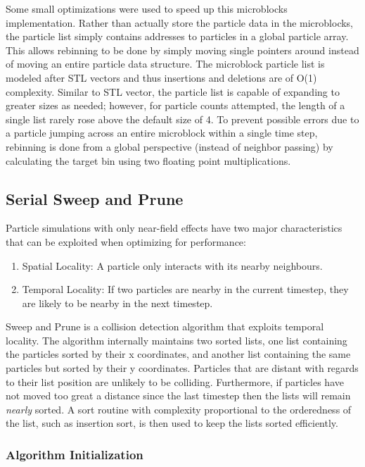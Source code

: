 \documentclass[11pt]{article} %
\begin{document}
Some small optimizations were used to speed up this microblocks implementation. Rather than actually store the particle data in the microblocks, the particle list simply contains addresses to particles in a global particle array. This allows rebinning to be done by simply moving single pointers around instead of moving an entire particle data structure. The microblock particle list is modeled after STL vectors and thus insertions and deletions are of O(1) complexity. Similar to STL vector, the particle list is capable of expanding to greater sizes as needed; however, for particle counts attempted, the length of a single list rarely rose above the default size of 4. To prevent possible errors due to a particle jumping across an entire microblock within a single time step, rebinning is done from a global perspective (instead of neighbor passing) by calculating the target bin using two floating point multiplications.

\subsection{Serial Sweep and Prune}

Particle simulations with only near-field effects have two major characteristics
that can be exploited when optimizing for performance:
\begin{enumerate}
\item Spatial Locality: A particle only interacts with its nearby neighbours.
\item Temporal Locality: If two particles are nearby in the current timestep,
they are likely to be nearby in the next timestep.
\end{enumerate}
Sweep and Prune is a collision detection algorithm that exploits temporal
locality. The algorithm internally maintains two sorted lists, one
list containing the particles sorted by their x coordinates, and another
list containing the same particles but sorted by their y coordinates.
Particles that are distant with regards to their list position are
unlikely to be colliding. Furthermore, if particles have not moved
too great a distance since the last timestep then the lists will remain
\emph{nearly} sorted. A sort routine with complexity proportional
to the orderedness of the list, such as insertion sort, is then used
to keep the lists sorted efficiently. 

\subsubsection{Algorithm Initialization}
\end{document}
